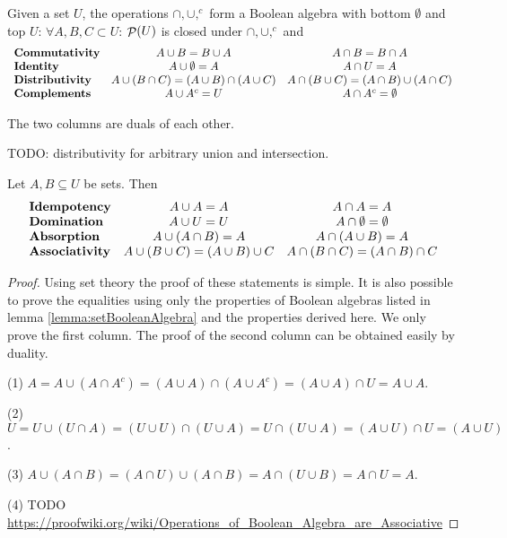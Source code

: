 \begin{proposition} \label{lemma:setBooleanAlgebra}
Given a set $U$, the operations $\cap, \cup, ^c$ form a Boolean algebra with bottom $\emptyset$ and top $U$: $\forall A,B,C\subset U$: $\mathop{\mathcal{P}}(U)$ is closed under $\cap, \cup, ^c$ and
\[ \begin{array}{l c c}
\text{\textbf{Commutativity}} & A\cup B= B\cup A & A\cap B = B\cap A \\
\text{\textbf{Identity}} & A\cup\emptyset = A & A\cap U = A \\
\text{\textbf{Distributivity}} & A\cup(B\cap C) = (A\cup B)\cap(A\cup C) & A\cap(B\cup C) = (A\cap B)\cup(A\cap C) \\
\text{\textbf{Complements}} & A\cup A^c = U & A\cap A^c = \emptyset
\end{array} \]
\end{proposition}
The two columns are duals of each other.

TODO: distributivity for arbitrary union and intersection.

\begin{corollary} \label{lemma:BooleanConsequences}
Let $A,B\subseteq U$ be sets. Then
\[ \begin{array}{l c c}
\text{\textbf{Idempotency}} & A\cup A = A & A\cap A = A \\
\text{\textbf{Domination}} & A\cup U = U & A\cap \emptyset = \emptyset \\
\text{\textbf{Absorption}} & A\cup(A\cap B) = A & A\cap(A\cup B) = A \\
\text{\textbf{Associativity}} & A\cup(B\cup C) = (A\cup B)\cup C & A\cap(B\cap C) = (A\cap B)\cap C
\end{array} \]
\end{corollary}
\begin{proof}
Using set theory the proof of these statements is simple. It is also possible to prove the equalities using only the properties of Boolean algebras listed in lemma \ref{lemma:setBooleanAlgebra} and the properties derived here. We only prove the first column. The proof of the second column can be obtained easily by duality.

(1) $A = A\cup(A\cap A^c) = (A\cup A)\cap (A\cup A^c) = (A\cup A)\cap U = A\cup A$.

(2) $U = U\cup (U\cap A) = (U\cup U)\cap (U\cup A) = U\cap (U\cup A) = (A\cup U)\cap U = (A\cup U)$.

(3) $A\cup(A\cap B) = (A\cap U)\cup(A\cap B) = A\cap(U\cup B) = A\cap U = A$.

(4) TODO \url{https://proofwiki.org/wiki/Operations_of_Boolean_Algebra_are_Associative}
\end{proof}

